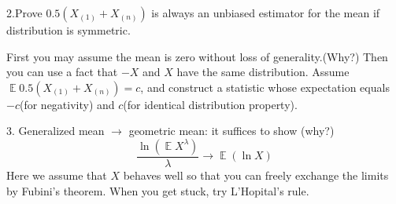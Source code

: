 \documentclass[12pt]{article}
\newcommand{\E}{\operatorname{\mathbb{E}}}
\begin{document}
2.Prove $0.5( X_{(1)} + X_{(n)})$ is always an unbiased estimator for the mean if distribution is symmetric.

First you may assume the mean is zero without loss of generality.(Why?) Then you can use a fact that $-X$ and $X$ have the same distribution. Assume $\E 0.5( X_{(1)} + X_{(n)}) =c$, and construct a statistic whose expectation equals $-c$(for negativity) and $c$(for identical distribution property).

3. Generalized mean $\rightarrow$ geometric mean: it suffices to show (why?)
$$
\frac{\ln (\E X^\lambda)}{\lambda} \rightarrow \E (\ln X)
$$
Here we assume that $X$ behaves well so that you can freely exchange the limits by Fubini's theorem. When you get stuck, try L'Hopital's rule.
\end{document}
